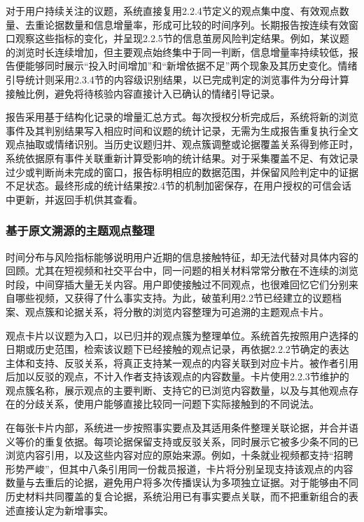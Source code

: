 对于用户持续关注的议题，系统直接复用2.2.4节定义的观点集中度、有效观点数量、去重论据数量和信息增量率，形成可比较的时间序列。长期报告按连续有效窗口观察这些指标的变化，并呈现2.2.5节的信息茧房风险判定结果。例如，某议题的浏览时长连续增加，但主要观点始终集中于同一判断，信息增量率持续较低，报告便能够同时展示``投入时间增加''和``新增依据不足''两个现象及其历史变化。情绪引导统计则采用2.3.4节的内容级识别结果，以已完成判定的浏览事件为分母计算接触比例，避免将待核验内容直接计入已确认的情绪引导记录。

报告采用基于结构化记录的增量汇总方式。每次授权分析完成后，系统将新的浏览事件及其判别结果写入相应时间和议题的统计记录，无需为生成报告重复执行全文观点抽取或情绪识别。当历史议题归并、观点簇调整或论据覆盖关系得到修正时，系统依据原有事件关联重新计算受影响的统计结果。对于采集覆盖不足、有效记录过少或判断尚未完成的窗口，报告标明相应的数据范围，并保留风险判定中的证据不足状态。最终形成的统计结果按2.4节的机制加密保存，在用户授权的可信会话中更新，并返回手机供其查看。

\subsubsection{基于原文溯源的主题观点整理}\label{section:2.5.2}

时间分布与风险指标能够说明用户近期的信息接触特征，却无法代替对具体内容的回顾。尤其在短视频和社交平台中，同一问题的相关材料常常分散在不连续的浏览时段，中间穿插大量无关内容。用户即使接触过不同观点，也很难回忆它们分别来自哪些视频，又获得了什么事实支持。为此，破茧利用2.2节已经建立的议题档案、观点簇和论据关系，将分散的浏览内容整理为可追溯的主题观点卡片。

观点卡片以议题为入口，以已归并的观点簇为整理单位。系统首先按照用户选择的日期或历史范围，检索该议题下已经接触的观点记录，再依据2.2.2节确定的表达主体和支持、反驳关系，将真正支持某一观点的内容关联到对应卡片。被作者引用后加以反驳的观点，不计入作者支持该观点的内容数量。卡片使用2.2.3节维护的观点簇名称，展示观点的主要判断、支持它的已浏览内容数量，以及与其他观点存在的分歧关系，使用户能够直接比较同一问题下实际接触到的不同说法。

在每张卡片内部，系统进一步按照事实要点及其适用条件整理关联论据，并合并语义等价的重复依据。每项论据保留支持或反驳关系，同时展示它被多少条不同的已浏览内容引用，以及这些内容对应的原始来源。例如，十条就业视频都支持``招聘形势严峻''，但其中八条引用同一份裁员报道，卡片将分别呈现支持该观点的内容数量与去重后的论据，避免用户将多次传播误认为多项独立证据。对于能够由不同历史材料共同覆盖的复合论据，系统沿用已有事实要点关联，而不把重新组合的表述直接认定为新增事实。

